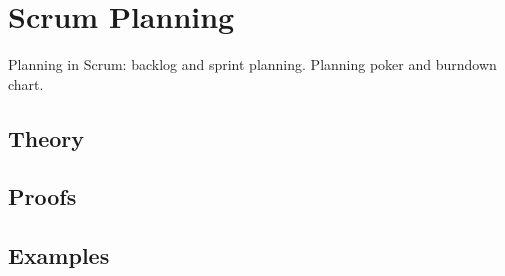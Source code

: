 
\section{Scrum Planning}
\label{sec:2.6.08-scrum-planning}

\begin{ticket}
Planning in Scrum: backlog and sprint planning. Planning poker and burndown chart.
\end{ticket}

\subsection*{Theory}

\subsection*{Proofs}

\subsection*{Examples}
